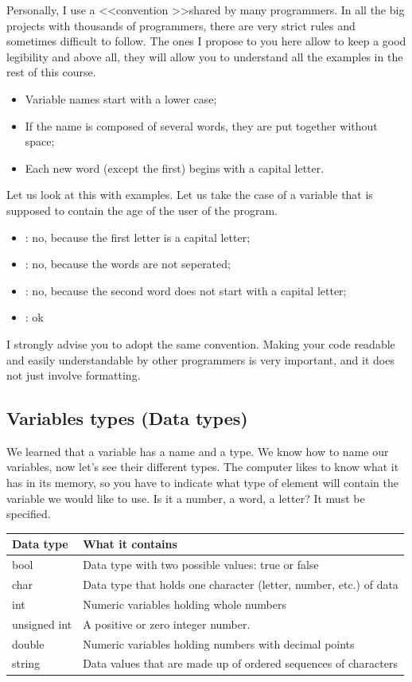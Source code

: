 \documentclass[11pt, a4paper]{article}
\begin{document}
Personally, I use a \textless\textless convention \textgreater\textgreater shared by many programmers.
In all the big projects with thousands of programmers, there are very strict rules and sometimes difficult
to follow. The ones I propose to you here allow to keep a good legibility and above
all, they will allow you to understand all the examples in the rest of this course.
\begin{itemize}
\item Variable names start with a lower case;
\item If the name is composed of several words, they are put together without space;
\item Each new word (except the first) begins with a capital letter.
\end{itemize}

\noindent Let us look at this with examples. Let us take the case of a variable that is supposed
to contain the age of the user of the program.

\begin{itemize}
    \item {}: no, because the first letter is a capital letter;
    \item {}: no, because the words are not seperated;
    \item {}: no, because the second word does not start with a capital letter;
    \item {}: ok
\end{itemize}

I strongly advise you to adopt the same convention. Making your code readable and easily
understandable by other programmers is very important, and it does not just involve formatting.

\subsection{Variables types (Data types)}
We learned that a variable has a name and a type. We know how to name our variables, now let’s
see their different types. The computer likes to know what it has in its memory, so you have
to indicate what type of element will contain the variable we would like to use. Is it a number,
a word, a letter? It must be specified.\\

\begin{tabular}{ |p{3cm}||p{10cm}| }
    \hline
    \textbf{Data type} & \textbf{What it contains} \\
    \hline
    bool  & Data type with two possible values: true or false    \\
    char&   Data type that holds one character (letter, number, etc.) of data  \\
    int &Numeric variables holding whole numbers \\
    unsigned int    &A positive or zero integer number.\\
    double&   Numeric variables holding numbers with decimal points  \\
    string& Data values that are made up of ordered sequences of characters\\
    \hline
\end{tabular}
\end{document}
